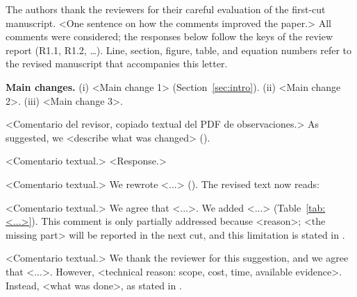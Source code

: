 \documentclass{LabDSTresponse}
\begin{document}


The authors thank the reviewers for their careful evaluation of the first-cut manuscript. <One sentence on how the comments improved the paper.> All comments were considered; the responses below follow the keys of the review report (R1.1, R1.2, \ldots). Line, section, figure, table, and equation numbers refer to the revised manuscript that accompanies this letter.

\textbf{Main changes.} (i) <Main change 1> (Section~\ref{sec:intro}). (ii) <Main change 2>. (iii) <Main change 3>.

\LabDSTsummary


{<Comentario del revisor, copiado textual del PDF de observaciones.>}
{As suggested, we <describe what was changed> ().}

{<Comentario textual.>}
{<Response.>}


{<Comentario textual.>}
{We rewrote <...> (). The revised text now reads:
}


{<Comentario textual.>}
{We agree that <...>. We added <...> (Table~\ref{tab:<...>}). This comment is only partially addressed because <reason>; <the missing part> will be reported in the next cut, and this limitation is stated in .}


{<Comentario textual.>}
{We thank the reviewer for this suggestion, and we agree that <...>. However, <technical reason: scope, cost, time, available evidence>. Instead, <what was done>, as stated in .}
\end{document}
